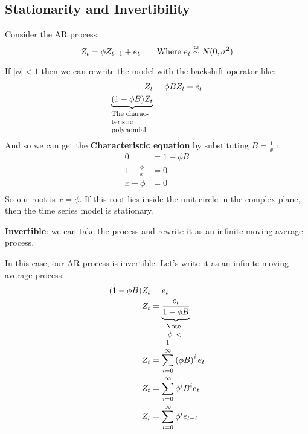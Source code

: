 \subsection{Stationarity and Invertibility}
Consider the AR process:
\begin{equation*}
    Z_{t} = \phi Z_{t-1} + e_{t} \qquad \text{Where $e_t \iid N(0, \sigma^2)$}
\end{equation*}

If $|\phi| < 1$ then we can rewrite the model with the backshift operator like:
\begin{equation*}
    \begin{aligned}
        Z_{t} &= \phi B Z_{t} + e_{t} \\
        \explain{(1 - \phi B)Z_{t}}{The characteristic polynomial} \\
    \end{aligned}
\end{equation*}
And so we can get the \textbf{Characteristic equation} by substituting $B =
\frac{1}{x}$ :
\begin{equation*}
    \begin{aligned}
        0 &= 1 - \phi B \\
        1 - \frac{\phi}{x} &= 0 \\
        x - \phi &= 0 \\
    \end{aligned}
\end{equation*}
So our root is $x = \phi $. If this root lies inside the unit circle in the
complex plane, then the time series model is stationary.

\textbf{Invertible}: we can take the process and rewrite it as an infinite
moving average process.

In this case, our AR process is invertible. Let's write it as an infinite
moving average process:
\begin{equation*}
    \begin{aligned}
        (1 - \phi B) Z_{t} &= e_{t} \\
        Z_{t} &= \explain{\frac{e_{t}}{1 - \phi B}}{Note $|\phi| < 1$} \\
        Z_{t} &= \sum_{i=0}^{\infty} \left( \phi B \right)^{i} e_{t} \\
        Z_{t} &= \sum_{i=0}^{\infty} \phi^{i} B^{i} e_{t} \\
        Z_{t} &= \sum_{i=0}^{\infty} \phi^{i} e_{t-i} \\
    \end{aligned}
\end{equation*}

